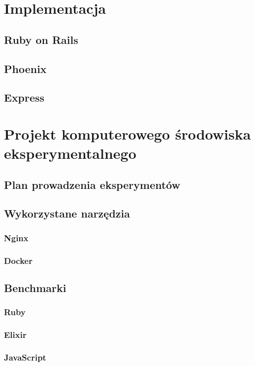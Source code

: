 \documentclass[mgr,oneside]{mgr}
\begin{document}
\chapter{Implementacja}
\section{Ruby on Rails}
\section{Phoenix}
\section{Express}

\chapter{Projekt komputerowego środowiska eksperymentalnego}
\section{Plan prowadzenia eksperymentów}

\section{Wykorzystane narzędzia}
\subsection{Nginx}
\subsection{Docker}
\section{Benchmarki}
\subsection{Ruby}
\subsection{Elixir}
\subsection{JavaScript}
\end{document}
